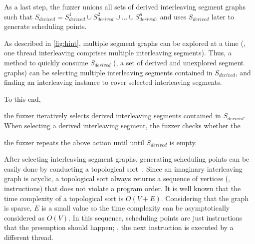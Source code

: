 


As a last step, the fuzzer unions all sets of derived interleaving
segment graphs such that
$S_{derived} = S^{1}_{derived} \cup S^{2}_{derived} \cup ... \cup
S^{n}_{derived}$, and uses $S_{derived}$ later to generate scheduling
points.




%
As described in \autoref{fig:hint}, multiple segment graphs can be
explored at a time (\ie, one thread interleaving comprises multiple
interleaving segments).
%
Thus, a method to quickly consume $S_{derived}$ (\ie, a set of derived
and unexplored segment graphs) can be selecting multiple interleaving
segments contained in $S_{derived}$, and finding an interleaving
instance to cover selected interleaving segments.


To this end,


the fuzzer iteratively selects derived interleaving
segments contained in $S_{derived}$.
%
When selecting a derived interleaving segment, the fuzzer checks
whether the



the fuzzer repeats the above action until until $S_{derived}$ is
empty.









%
After selecting interleaving segment graphs, generating scheduling
points can be easily done by conducting a topological
sort~\cite{topologicalsort}.
%
Since an imaginary interleaving graph is acyclic, a topological sort
always returns a sequence of vertices (\ie, instructions) that does
not violate a program order.
%
It is well known that the time complexity of a topological sort is
$O(V+E)$. Considering that the graph is sparse, $E$ is a small value
so the time complexity can be asymptotically considered as $O(V)$.
%
In this sequence, scheduling points are just instructions that the
preemption should happen; \ie, the next instruction is executed by a
different thread.




